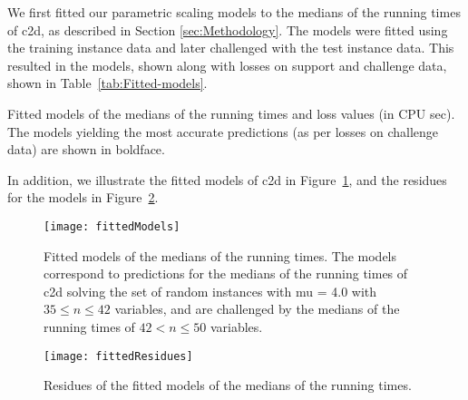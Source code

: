We first fitted our parametric scaling models to the
medians of the
 running times
of c2d, as described in Section \ref{sec:Methodology}. The
models were fitted using the training instance data and later
challenged with the test instance data.
This resulted in the models, shown along with losses on support and
challenge data, shown in Table~\ref{tab:Fitted-models}.
\begin{table}[tb]
\begin{centering}

% 
\par\end{centering}

\caption{\label{tab:Fitted-models}Fitted models of the medians
of the  running
times and loss
values (in CPU sec). The models yielding the most
accurate predictions (as per losses on challenge data) are shown in
boldface.}
\end{table}
In addition, we illustrate the fitted models of c2d in
Figure~\ref{fig:Fitted-models},
and the residues for the models in Figure~\ref{fig:Fitted-residues}.
\begin{figure}[tb]
\noindent \begin{centering}
\texttt{[image: fittedModels]}
\par\end{centering}

\caption{\label{fig:Fitted-models} Fitted models of the medians of the
 running times.
The models correspond to predictions for the medians of the
 running times of
c2d solving the set of random instances with mu = 4.0
with $35\leq n\leq 42$ variables, and are challenged by the medians of
the 
running times of $42< n \leq 50$ variables.}
\end{figure}


\begin{figure}[tb]
\noindent \begin{centering}
\texttt{[image: fittedResidues]}
\par\end{centering}

\caption{\label{fig:Fitted-residues} Residues of the fitted models of the
medians of the 
running times. }
\end{figure}


